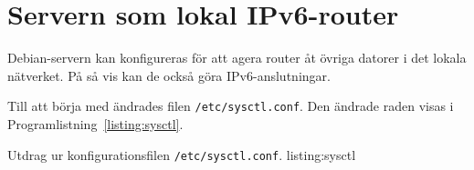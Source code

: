 %
%
%


\section{Servern som lokal IPv6-router}
Debian-servern kan konfigureras för att agera router åt övriga datorer i det
lokala nätverket. På så vis kan de också göra IPv6-anslutningar.

Till att börja med ändrades filen \texttt{/etc/sysctl.conf}. Den ändrade
raden visas i Programlistning~\ref{listing:sysctl}.

             {Utdrag ur konfigurationsfilen \texttt{/etc/sysctl.conf}.}
             {listing:sysctl}

